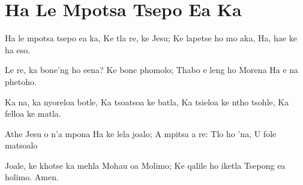 \starttocol
\chapter{Ha Le Mpotsa Tsepo Ea Ka }
\nexttocol
\hfill{\it }
\stoptocol
\starttocol
\startlines
{\sc Ha} le mpotsa tsepo ea ka,
Ke tla re, ke Jesu;
Ke lapetse ho mo aka,
Ha, hae ke ha eso.

Le re, ka bone'ng ho eena?
Ke bone phomolo;
Thabo e leng ho Morena
Ha e na phetoho.

Ka na, ka nyoreloa botle,
Ka tsoatsoa ke batla,
Ka tsieloa ke ntho tsohle,
Ka felloa ke matla.

Athe Jesu o n'a mpona
Ha ke lela joalo;
A mpitsa a re: Tlo ho 'na,
U fole matsoalo

Joale, ke khotse ka mehla
Mohau oa Molimo;
Ke qalile ho iketla
Tsepong ea holimo. 
\hfill Amen.~~~~~~~~~

\stoplines
\nexttocol

\stoptocol
